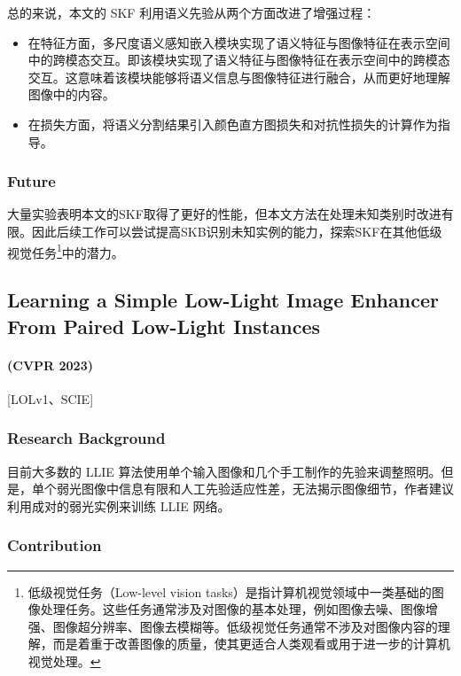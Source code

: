 \documentclass[letterpaper,10pt]{article}
\begin{document}
			总的来说，本文的 SKF 利用语义先验从两个方面改进了增强过程：
			
			\begin{itemize}
				\item [(1)]
				在特征方面，多尺度语义感知嵌入模块实现了语义特征与图像特征在表示空间中的跨模态交互。即该模块实现了语义特征与图像特征在表示空间中的跨模态交互。这意味着该模块能够将语义信息与图像特征进行融合，从而更好地理解图像中的内容。
				\item [(2)]
				在损失方面，将语义分割结果引入颜色直方图损失和对抗性损失的计算作为指导。
			\end{itemize}
			
			\subsubsection{Future}
			
			大量实验表明本文的SKF取得了更好的性能，但本文方法在处理未知类别时改进有限。因此后续工作可以尝试提高SKB识别未知实例的能力，探索SKF在其他低级视觉任务\footnote{低级视觉任务（Low-level vision tasks）是指计算机视觉领域中一类基础的图像处理任务。这些任务通常涉及对图像的基本处理，例如图像去噪、图像增强、图像超分辨率、图像去模糊等。低级视觉任务通常不涉及对图像内容的理解，而是着重于改善图像的质量，使其更适合人类观看或用于进一步的计算机视觉处理。}中的潜力。
	
		\subsection{Learning a Simple Low-Light Image Enhancer From Paired Low-Light Instances}
		\paragraph{(CVPR 2023)} [LOLv1、SCIE]
			
			\subsubsection{Research Background}
			
			目前大多数的 LLIE 算法使用单个输入图像和几个手工制作的先验来调整照明。但是，单个弱光图像中信息有限和人工先验适应性差，无法揭示图像细节，作者建议利用成对的弱光实例来训练 LLIE 网络。
	
			\subsubsection{Contribution}
			
\end{document}
